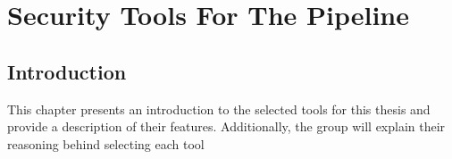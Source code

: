 \chapter{Security Tools For The Pipeline}

\section{Introduction}
This chapter presents an introduction to the selected tools for this thesis and provide a description of their features. Additionally, the group will explain their reasoning behind selecting each tool



